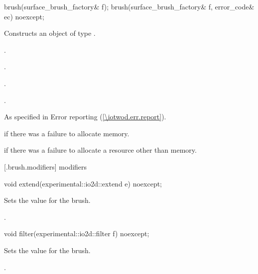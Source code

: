 \begin{itemdecl}
    brush(surface_brush_factory& f);
    brush(surface_brush_factory& f, error_code& ec) noexcept;
\end{itemdecl}
\begin{itemdescr}
	\pnum
	\effects
	Constructs an object of type .
	
	\pnum
	\postconditions
	.
	
	.
	
	.
	
	.

	\pnum
	\throws
	As specified in Error reporting (\ref{\iotwod.err.report}).
	
	\pnum
	\errors
	 if there was a failure to allocate memory.
	
	 if there was a failure to allocate a resource other than memory.
	
\end{itemdescr}

 [\iotwod.brush.modifiers]{ modifiers}

\begin{itemdecl}
    void extend(experimental::io2d::extend e) noexcept;
\end{itemdecl}
\begin{itemdescr}
	\pnum
	\effects
	Sets the  value for the brush.
	
	\pnum
	\postconditions
	.
	
\end{itemdescr}

\begin{itemdecl}
    void filter(experimental::io2d::filter f) noexcept;
\end{itemdecl}
\begin{itemdescr}
	\pnum
	\effects
	Sets the  value for the brush.
	
	\pnum
	\postconditions
	.
	
\end{itemdescr}

